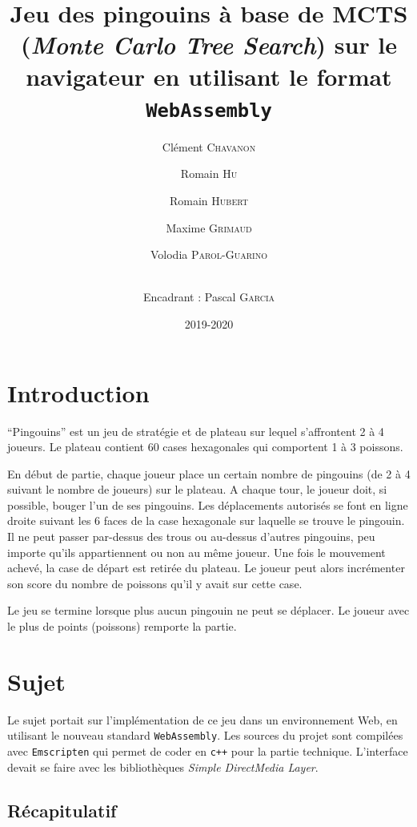 \documentclass[a4paper,11pt]{article}
\title{\textbf{Jeu des pingouins à base de MCTS (\emph{Monte Carlo Tree Search}) sur le
navigateur en utilisant le format \texttt{WebAssembly}}}
\author{Clément \textsc{Chavanon} \and Romain \textsc{Hu} \and Romain \textsc{Hubert} \and Maxime \textsc{Grimaud} \and Volodia \textsc{Parol-Guarino} \and 
 \\ Encadrant : Pascal \textsc{Garcia}}
\date{2019-2020}
\begin{document}
\maketitle
\begin{abstract}

\end{abstract}

\section*{Introduction}\label{introduction}

``Pingouins'' est un jeu de stratégie et de plateau sur lequel
s'affrontent 2 à 4 joueurs. Le plateau contient 60 cases hexagonales qui
comportent 1 à 3 poissons.

En début de partie, chaque joueur place un certain nombre de pingouins
(de 2 à 4 suivant le nombre de joueurs) sur le plateau. A chaque tour,
le joueur doit, si possible, bouger l'un de ses pingouins. Les
déplacements autorisés se font en ligne droite suivant les 6 faces de la
case hexagonale sur laquelle se trouve le pingouin. Il ne peut passer
par-dessus des trous ou au-dessus d'autres pingouins, peu importe qu'ils
appartiennent ou non au même joueur. Une fois le mouvement achevé, la
case de départ est retirée du plateau. Le joueur peut alors incrémenter
son score du nombre de poissons qu'il y avait sur cette case.

Le jeu se termine lorsque plus aucun pingouin ne peut se déplacer. Le
joueur avec le plus de points (poissons) remporte la partie.

\section{Sujet}\label{sujet}

Le sujet portait sur l'implémentation de ce jeu dans un environnement
Web, en utilisant le nouveau standard \texttt{WebAssembly}. Les sources
du projet sont compilées avec \texttt{Emscripten} qui permet de coder en
\texttt{c++} pour la partie technique. L'interface devait se faire avec
les bibliothèques \emph{Simple DirectMedia Layer}.

\subsection{Récapitulatif}\label{ruxe9capitulatif}
\end{document}
